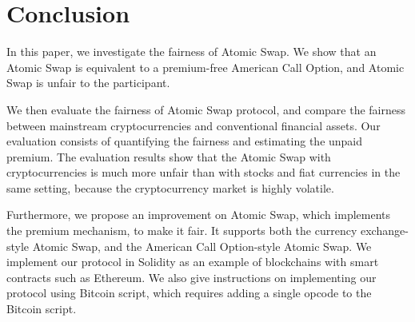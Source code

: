 \section{Conclusion}
\label{sec:conclusion}


In this paper, we investigate the fairness of Atomic Swap.
We show that an Atomic Swap is equivalent to a premium-free American Call Option, and Atomic Swap is unfair to the participant.

We then evaluate the fairness of Atomic Swap protocol, and compare the fairness between mainstream cryptocurrencies and conventional financial assets.
Our evaluation consists of quantifying the fairness and estimating the unpaid premium.
The evaluation results show that the Atomic Swap with cryptocurrencies is much more unfair than with stocks and fiat currencies in the same setting, because the cryptocurrency market is highly volatile.

Furthermore, we propose an improvement on Atomic Swap, which implements the premium mechanism, to make it fair.
It supports both the currency exchange-style Atomic Swap, and the American Call Option-style Atomic Swap.
We implement our protocol in Solidity as an example of blockchains with smart contracts such as Ethereum.
We also give instructions on implementing our protocol using Bitcoin script, which requires adding a single opcode to the Bitcoin script.